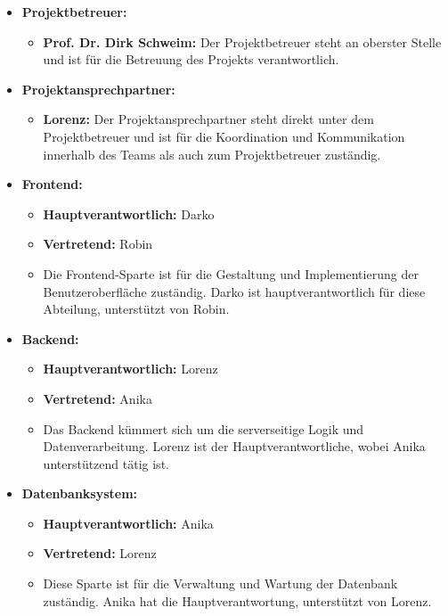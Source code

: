 \begin{itemize}[itemsep=1em, leftmargin=*]
    \item \textbf{Projektbetreuer:}
    \begin{itemize}
        \item \textbf{Prof. Dr. Dirk Schweim:} Der Projektbetreuer steht an oberster Stelle und ist für die Betreuung des Projekts verantwortlich.
    \end{itemize}

    \item \textbf{Projektansprechpartner:}
    \begin{itemize}
        \item \textbf{Lorenz:} Der Projektansprechpartner steht direkt unter dem Projektbetreuer und ist für die Koordination und Kommunikation innerhalb des Teams als auch zum Projektbetreuer zuständig.
    \end{itemize}
    \newpage
    \item \textbf{Frontend:}
    \begin{itemize}
        \item \textbf{Hauptverantwortlich:} Darko
        \item \textbf{Vertretend:} Robin
        \item Die Frontend-Sparte ist für die Gestaltung und Implementierung der Benutzeroberfläche zuständig.
        Darko ist hauptverantwortlich für diese Abteilung, unterstützt von Robin.
    \end{itemize}

    \item \textbf{Backend:}
    \begin{itemize}
        \item \textbf{Hauptverantwortlich:} Lorenz
        \item \textbf{Vertretend:} Anika
        \item Das Backend kümmert sich um die serverseitige Logik und Datenverarbeitung.
        Lorenz ist der Hauptverantwortliche, wobei Anika unterstützend tätig ist.
    \end{itemize}

    \item \textbf{Datenbanksystem:}
    \begin{itemize}
        \item \textbf{Hauptverantwortlich:} Anika
        \item \textbf{Vertretend:} Lorenz
        \item Diese Sparte ist für die Verwaltung und Wartung der Datenbank zuständig.
        Anika hat die Hauptverantwortung, unterstützt von Lorenz.
    \end{itemize}


\end{itemize}
